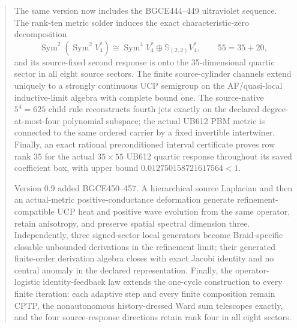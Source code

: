\documentclass[11pt]{article}
\theoremstyle{definition}
\theoremstyle{remark}
\newcommand{\Sym}{\operatorname{Sym}}
\begin{document}
\begin{abstract}
The same version now includes the BGCE444--449 ultraviolet sequence. The rank-ten metric solder induces the exact characteristic-zero decomposition
\[
 \Sym^2(\Sym^2V_4^*)\cong \Sym^4V_4^*\oplus\mathbb S_{(2,2)}V_4^*,
 \qquad 55=35+20,
\]
and its source-fixed second response is onto the 35-dimensional quartic sector in all eight source sectors. The finite source-cylinder channels extend uniquely to a strongly continuous UCP semigroup on the AF/quasi-local inductive-limit algebra with complete bound one. The source-native $5^4=625$ child rule reconstructs fourth jets exactly on the declared degree-at-most-four polynomial subspace; the actual UB612 PBM metric is connected to the same ordered carrier by a fixed invertible intertwiner. Finally, an exact rational preconditioned interval certificate proves row rank 35 for the actual $35\times55$ UB612 quartic response throughout its saved coefficient box, with upper bound $0.012750158721617564<1$.

Version 0.9 added BGCE450--457. A hierarchical source Laplacian and then an actual-metric positive-conductance deformation generate refinement-compatible UCP heat and positive wave evolution from the same operator, retain anisotropy, and preserve spatial spectral dimension three. Independently, three signed-sector local generators become Braid-specific closable unbounded derivations in the refinement limit; their generated finite-order derivation algebra closes with exact Jacobi identity and no central anomaly in the declared representation. Finally, the operator-logistic identity-feedback law extends the one-cycle construction to every finite iteration: each adaptive step and every finite composition remain CPTP, the nonautonomous history-dressed Ward sum telescopes exactly, and the four source-response directions retain rank four in all eight sectors.


\end{abstract}
\end{document}

